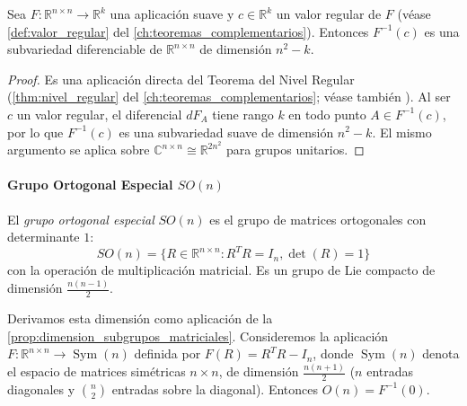 \begin{proposition}\label{prop:dimension_subgrupos_matriciales}
Sea $F: \mathbb{R}^{n \times n} \to \mathbb{R}^k$ una aplicación suave y $c \in \mathbb{R}^k$ un valor regular de $F$ (véase \autoref{def:valor_regular} del \autoref{ch:teoremas_complementarios}). Entonces $F^{-1}(c)$ es una subvariedad diferenciable de $\mathbb{R}^{n \times n}$ de dimensión $n^2 - k$.
\end{proposition}

\begin{proof}
Es una aplicación directa del Teorema del Nivel Regular (\autoref{thm:nivel_regular} del \autoref{ch:teoremas_complementarios}; véase también \citep[Capítulo~5]{lee2012introduction}). Al ser $c$ un valor regular, el diferencial $dF_A$ tiene rango $k$ en todo punto $A \in F^{-1}(c)$, por lo que $F^{-1}(c)$ es una subvariedad suave de dimensión $n^2 - k$. El mismo argumento se aplica sobre $\mathbb{C}^{n \times n} \cong \mathbb{R}^{2n^2}$ para grupos unitarios.
\end{proof}

\paragraph{Grupo Ortogonal Especial $SO(n)$}

\begin{definition}\label{def:grupo_so_n}
El \textit{grupo ortogonal especial} $SO(n)$ es el grupo de matrices ortogonales con determinante $1$:
\begin{equation}
SO(n) = \{R \in \mathbb{R}^{n \times n} : R^T R = I_n, \det(R) = 1\}
\end{equation}
con la operación de multiplicación matricial. Es un grupo de Lie compacto de dimensión $\frac{n(n-1)}{2}$.
\end{definition}

Derivamos esta dimensión como aplicación de la \autoref{prop:dimension_subgrupos_matriciales}. Consideremos la aplicación $F: \mathbb{R}^{n \times n} \to \operatorname{Sym}(n)$ definida por $F(R) = R^T R - I_n$, donde $\operatorname{Sym}(n)$ denota el espacio de matrices simétricas $n \times n$, de dimensión $\frac{n(n+1)}{2}$ ($n$ entradas diagonales y $\binom{n}{2}$ entradas sobre la diagonal). Entonces $O(n) = F^{-1}(0)$.

